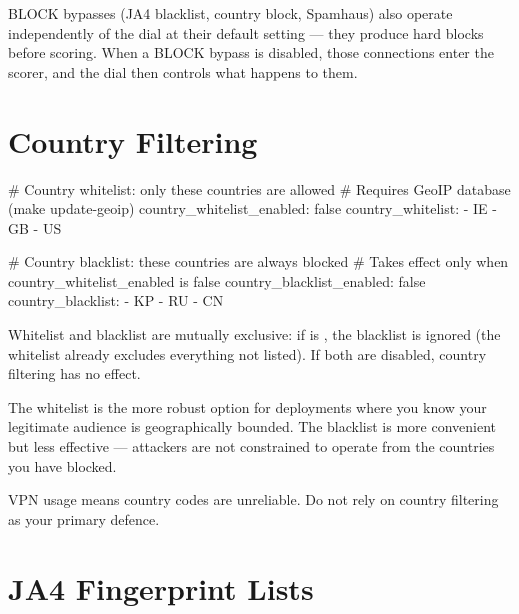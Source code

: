 BLOCK bypasses (JA4 blacklist, country block, Spamhaus) also operate independently
of the dial at their default setting — they produce hard blocks before scoring.
When a BLOCK bypass is disabled, those connections enter the scorer, and the dial
then controls what happens to them.

\section{Country Filtering}

\begin{yamlcode}
# Country whitelist: only these countries are allowed
# Requires GeoIP database (make update-geoip)
country_whitelist_enabled: false
country_whitelist:
  - IE
  - GB
  - US

# Country blacklist: these countries are always blocked
# Takes effect only when country_whitelist_enabled is false
country_blacklist_enabled: false
country_blacklist:
  - KP
  - RU
  - CN
\end{yamlcode}

Whitelist and blacklist are mutually exclusive: if 
is , the blacklist is ignored (the whitelist already excludes everything not
listed). If both are disabled, country filtering has no effect.

\begin{warningbox}
The whitelist is the more robust option for deployments where you know your legitimate
audience is geographically bounded. The blacklist is more convenient but less effective
— attackers are not constrained to operate from the countries you have blocked.

VPN usage means country codes are unreliable. Do not rely on country filtering as
your primary defence.
\end{warningbox}

\section{JA4 Fingerprint Lists}


